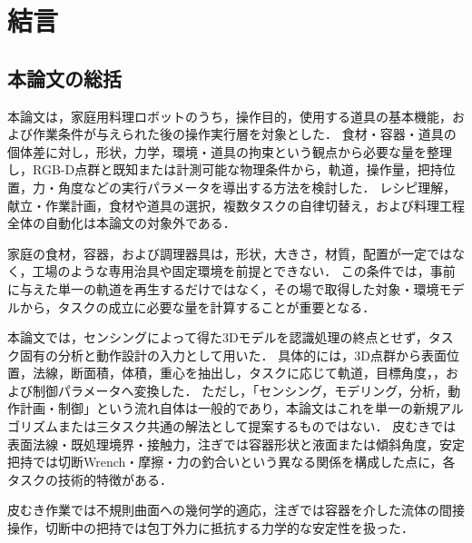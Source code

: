 \chapter{結言}
\label{chap:conclusion}

\section{本論文の総括}
\label{sec:conclusion_overview}

\begin{revisionblock}
本論文は，家庭用料理ロボットのうち，操作目的，使用する道具の基本機能，および作業条件が与えられた後の操作実行層を対象とした．
食材・容器・道具の個体差に対し，形状，力学，環境・道具の拘束という観点から必要な量を整理し，RGB-D点群と既知または計測可能な物理条件から，軌道，操作量，把持位置，力・角度などの実行パラメータを導出する方法を検討した．
レシピ理解，献立・作業計画，食材や道具の選択，複数タスクの自律切替え，および料理工程全体の自動化は本論文の対象外である．
\end{revisionblock}
家庭の食材，容器，および調理器具は，形状，大きさ，材質，配置が一定ではなく，工場のような専用治具や固定環境を前提とできない．
この条件では，事前に与えた単一の軌道を再生するだけではなく，その場で取得した対象・環境モデルから，タスクの成立に必要な量を計算することが重要となる．

\begin{revisionblock}
本論文では，センシングによって得た3Dモデルを認識処理の終点とせず，タスク固有の分析と動作設計の入力として用いた．
具体的には，3D点群から表面位置，法線，断面積，体積，重心を抽出し，タスクに応じて軌道，目標角度，{\nameholdingpointset}，および制御パラメータへ変換した．
ただし，「センシング，モデリング，分析，動作計画・制御」という流れ自体は一般的であり，本論文はこれを単一の新規アルゴリズムまたは三タスク共通の解法として提案するものではない．
皮むきでは表面法線・既処理境界・接触力，注ぎでは容器形状と液面または傾斜角度，安定把持では切断Wrench・摩擦・力の釣合いという異なる関係を構成した点に，各タスクの技術的特徴がある．
\end{revisionblock}

皮むき作業では不規則曲面への幾何学的適応，注ぎでは容器を介した流体の間接操作，切断中の把持では包丁外力に抵抗する力学的な安定性を扱った．

